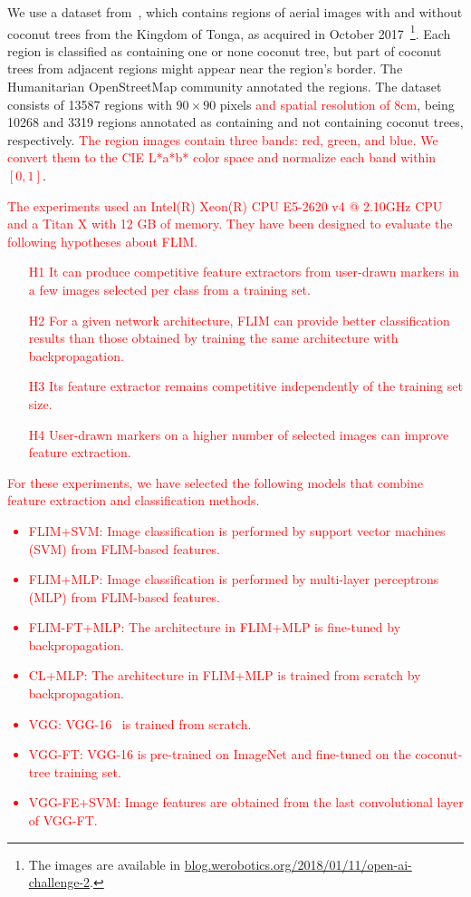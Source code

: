 \documentclass[journal, twoside]{IEEEtran}
\begin{document}
We use a dataset from~\cite{8899005}, which contains regions of aerial images with and without coconut trees from the Kingdom of Tonga, as acquired in October 2017~\footnote{The images are available in \url{blog.werobotics.org/2018/01/11/open-ai-challenge-2}.}. Each region is classified as containing one or none coconut tree, but part of coconut trees from adjacent regions might appear near the region's border. The Humanitarian OpenStreetMap community annotated the regions. The dataset consists of 13587 regions with $90 \times 90$ pixels \textcolor{red}{and spatial resolution of $8$\si{\centi\metre}}, being 10268 and 3319 regions annotated as containing and not containing coconut trees, respectively. \textcolor{red}{The region images contain three bands: red, green, and blue. We convert them to the CIE L*a*b* color space and normalize each band within $[0,1]$}.

\textcolor{red}{The experiments used an Intel(R) Xeon(R) CPU E5-2620 v4 @ 2.10GHz CPU and a Titan X with 12 GB of memory. They have been designed to evaluate the following hypotheses about FLIM.
\begin{enumerate}
  \item[H1]  It can produce competitive feature extractors from user-drawn markers in a few images selected per class from a training set. 
  \item[H2]  For a given network architecture, FLIM can provide better classification results than those obtained by training the same architecture with backpropagation.
  \item[H3] Its feature extractor remains competitive independently of the training set size. 
  \item[H4] User-drawn markers on a higher number of selected images can improve feature extraction.
\end{enumerate}
}

\textcolor{red}{For these experiments, we have selected the following models that combine feature extraction and classification methods.
 \begin{itemize}
\item FLIM+SVM: Image classification is performed by support vector machines (SVM) from FLIM-based features.  
\item FLIM+MLP: Image classification is performed by multi-layer perceptrons (MLP) from FLIM-based features.  
\item FLIM-FT+MLP: The architecture in FLIM+MLP is fine-tuned by backpropagation. 
\item CL+MLP: The architecture in FLIM+MLP is trained from scratch by backpropagation.
\item VGG: VGG-16~\cite{simonyan2014very} is trained from scratch.
\item VGG-FT: VGG-16 is pre-trained on ImageNet and fine-tuned on the coconut-tree training set.
\item VGG-FE+SVM: Image features are obtained from the last convolutional layer of VGG-FT.
\end{itemize}
}
\end{document}
